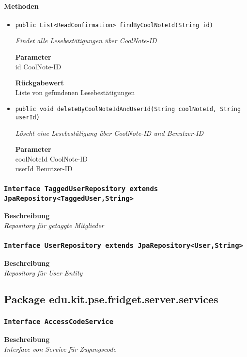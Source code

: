      \paragraph*{Methoden}
     \begin{itemize}
     	\item{\texttt{public List<ReadConfirmation> findByCoolNoteId(String id)}}
     	
     	\textit{Findet alle Lesebestätigungen über CoolNote-ID}
     	
     	\textbf{Parameter} \\
     	id CoolNote-ID
     	
     	\textbf{Rückgabewert} \\
     	Liste von gefundenen Lesebestätigungen        \item{\texttt{public void deleteByCoolNoteIdAndUserId(String coolNoteId, String userId)}}
     	
     	\textit{Löscht eine Lesebestätigung über CoolNote-ID und Benutzer-ID}
     	
     	\textbf{Parameter} \\
     	coolNoteId CoolNote-ID\\
     	userId Benutzer-ID
     	
     	
     \end{itemize}
     \subsubsection{\texttt{Interface TaggedUserRepository extends JpaRepository<TaggedUser,String>}}
     \textbf{Beschreibung} \\
     \textit{Repository für getaggte Mitglieder}
     \subsubsection{\texttt{Interface UserRepository extends JpaRepository<User,String>}}
     \textbf{Beschreibung} \\
     \textit{Repository für User Entity}
     \subsection{Package edu.kit.pse.fridget.server.services}
     \subsubsection{\texttt{Interface AccessCodeService}}
     \textbf{Beschreibung} \\
     \textit{Interface von Service für Zugangscode}
